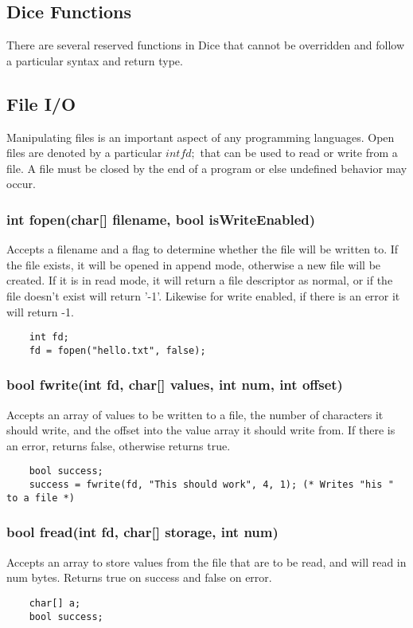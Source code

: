 \begin{homeworkProblem}
	\section{Dice Functions}
	
	There are several reserved functions in Dice that cannot be overridden and follow a particular syntax and return type.
	
	\subsection{File I/O}
	
	Manipulating files is an important aspect of any programming languages. Open files are denoted by a particular $int fd;$ that can be used to read or write from a file. A file must be closed by the end of a program or else undefined behavior may occur. 
	\subsubsection{int fopen(char[] filename, bool isWriteEnabled)}
	Accepts a filename and a flag to determine whether the file will be written to. If the file exists, it will be opened in append mode, otherwise a new file will be created. If it is in read mode, it will return a file descriptor as normal, or if the file doesn't exist will return '-1'. Likewise for write enabled, if there is an error it will return -1. 
	\begin{verbatim} 
	int fd;
	fd = fopen("hello.txt", false);
	\end{verbatim}
		
	\subsubsection{bool fwrite(int fd, char[] values, int num, int offset)}
	Accepts an array of values to be written to a file, the number of characters it should write, and the offset into the value array it should write from. If there is an error, returns false, otherwise returns true. 
	\begin{verbatim} 
	bool success;
	success = fwrite(fd, "This should work", 4, 1); (* Writes "his " to a file *)
	\end{verbatim}
	
	\subsubsection{bool fread(int fd, char[] storage, int num)}
	Accepts an array to store values from the file that are to be read, and will read in num bytes. Returns true on success and false on error.
	\begin{verbatim} 
	char[] a;
	bool success;


\end{verbatim}
\end{homeworkProblem}

